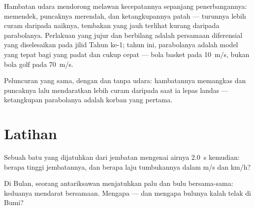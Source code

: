 \begin{remark}\label{rem:g12:projectile-motion:drag}
Hambatan udara mendorong melawan kecepatannya sepanjang penerbangannya:
 memendek, puncaknya merendah, dan ketangkupannya patah ---
turunnya lebih curam daripada naiknya, tembakan yang jauh terlihat kurang
daripada parabolanya. Perlakuan yang jujur dan berbilang adalah persamaan
diferensial yang diselesaikan pada jilid Tahun ke-1; tahun ini, parabolanya
adalah model yang tepat bagi  yang padat dan cukup cepat --- bola
basket pada \qty{10}{m/s}, bukan bola golf pada \qty{70}{m/s}.
\end{remark}

\begin{omfigure}

{\small Peluncuran yang sama, dengan dan tanpa udara: hambatannya memangkas
 dan puncaknya lalu mendaratkan  lebih curam daripada
saat ia lepas landas --- ketangkupan parabolanya adalah korban yang pertama.}
\end{omfigure}

\section{Latihan}

\begin{exercise}[$\star$]\label{exo:g12:projectile-motion:1}
Sebuah batu yang dijatuhkan dari jembatan mengenai airnya \qty{2.0}{s}
kemudian: berapa tinggi jembatannya, dan berapa laju tumbukannya dalam
\unit{m/s} dan \unit{km/h}?
\end{exercise}

\begin{exercise}[$\star$]\label{exo:g12:projectile-motion:2}
Di Bulan, seorang antariksawan menjatuhkan palu dan bulu bersama-sama:
keduanya mendarat bersamaan. Mengapa --- dan mengapa bulunya kalah telak di Bumi?
\end{exercise}

